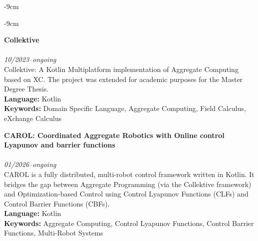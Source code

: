 \documentclass[10pt,a4paper]{altacv}
\begin{document}
\begin{adjustwidth}{}{-9cm}


    \divider
\end{adjustwidth}

\begin{adjustwidth}{}{-9cm}


    \textcolor{accent}{\textbf{Collektive}}\\
    \\
    \textit{10/2023--ongoing}\\ \smallskip
    Collektive: A Kotlin Multiplatform implementation of Aggregate Computing based on XC. The project was extended for academic purposes for the Master Degree Thesis.\\ \smallskip
    \textbf{Language:} Kotlin\\
    \textbf{Keywords:} Domain Specific Language, Aggregate Computing, Field Calculus, eXchange Calculus

   \divider

    \textcolor{accent}{\textbf{CAROL: Coordinated Aggregate Robotics with Online control Lyapunov and barrier functions}}\\
    \\
    \textit{01/2026--ongoing}\\ \smallskip
    CAROL is a fully distributed, multi-robot control framework written in Kotlin. It bridges the gap between Aggregate Programming (via the Collektive framework) and Optimization-based Control using Control Lyapunov Functions (CLFs) and Control Barrier Functions (CBFs).\\ \smallskip
    \textbf{Language:} Kotlin\\
    \textbf{Keywords:} Aggregate Computing, Control Lyapunov Functions, Control Barrier Functions, Multi-Robot Systems


\end{adjustwidth}
\end{document}
